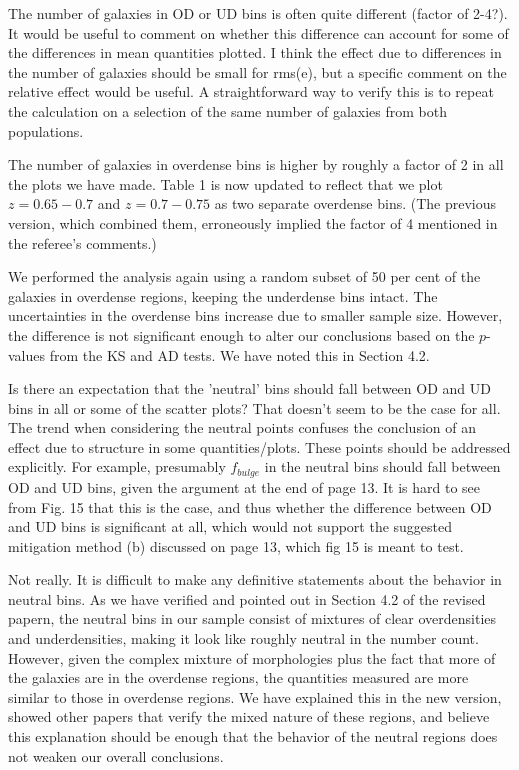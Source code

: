 \documentclass[english]{letter}
\begin{document}
\begin{shaded}
The number of galaxies in OD or UD bins is often quite different (factor of 2-4?). It would be useful to comment on whether this difference can account for some of the differences in mean quantities plotted. I think the effect due to differences in the number of galaxies should be small for rms(e), but a specific comment on the relative effect would be useful. A straightforward way to verify this is to repeat the calculation on a selection of the same number of galaxies from both populations.
\end{shaded}
\noindent 
The number of
galaxies in overdense bins is higher by roughly a factor of 2 in all the plots we have made. Table 1
is now updated to reflect that we plot $z=0.65-0.7$ and $z=0.7-0.75$ as two separate overdense bins.
(The previous version, which combined them, erroneously implied the factor of 4 mentioned in the
referee's comments.)

We performed the analysis again using a random subset of 50 per cent of the galaxies in overdense
regions, keeping the underdense bins intact. The uncertainties in the overdense bins increase due
to smaller sample size. However, the difference is not significant enough to alter our conclusions
based on the $p$-values from the KS and AD tests. We have noted this in Section 4.2.

\begin{shaded}
Is there an expectation that the 'neutral' bins should fall between OD and UD bins in all or some of the scatter plots? That doesn't seem to be the case for all. The trend when considering the neutral points confuses the conclusion of an effect due to structure in some quantities/plots. These points should be addressed explicitly. For example, presumably $f_{bulge}$ in the neutral bins should fall between OD and UD bins, given the argument at the end of page 13. It is hard to see from Fig. 15 that this is the case, and thus whether the difference between OD and UD bins is significant at all, which would not support the suggested mitigation method (b) discussed on page 13, which fig 15 is meant to test.
\end{shaded}

Not really. It is difficult to make any definitive statements about the behavior in neutral bins. As
we have verified and pointed out in Section 4.2 of the revised papern,
the neutral bins in our sample consist of mixtures of clear overdensities and underdensities, making
it look like roughly neutral in the number count. However, given the complex mixture of morphologies
plus the fact that more of the galaxies are in the overdense regions, the quantities measured are
more similar to those in overdense regions.  We have explained this in the new version, showed other
papers that verify the mixed nature of these regions, and believe this explanation should be enough
that the behavior of the neutral regions does not weaken our overall conclusions.
\end{document}
